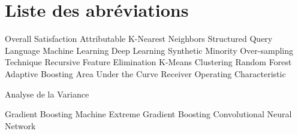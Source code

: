 \chapter*{Liste des abréviations}

\adjustmtc
\thispagestyle{MyStyle}

\begin{acronym}
 {Overall Satisfaction Attributable}
 {K-Nearest Neighbors}
 {Structured Query Language}
 {Machine Learning}
 {Deep Learning}
 {Synthetic Minority Over-sampling Technique}
 {Recursive Feature Elimination}
 {K-Means Clustering}
 {Random Forest}
 {Adaptive Boosting}
 {Area Under the Curve}
 {Receiver Operating Characteristic}

 {Analyse de la Variance}

 {Gradient Boosting Machine}
 {Extreme Gradient Boosting}
 {Convolutional Neural Network}













\end{acronym}